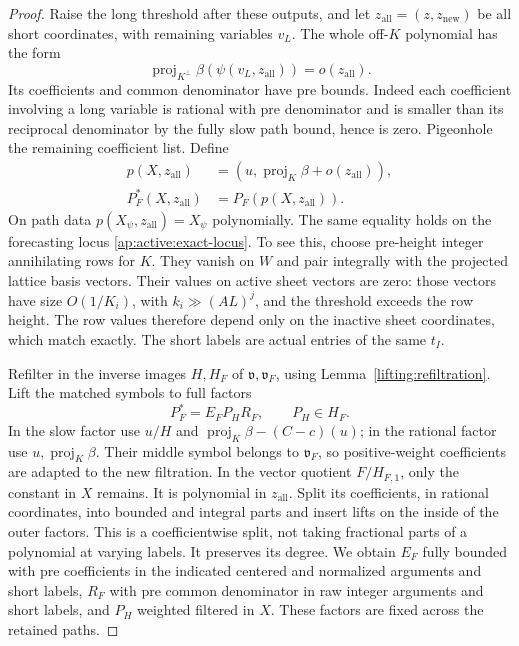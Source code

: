 \begin{proof}
Raise the long threshold after these outputs, and let
$z_{\mathrm{all}}=(z,z_{\mathrm{new}})$ be all short coordinates,
with remaining variables $v_L$.  The whole off-$K$ polynomial has
the form
\begin{equation}
 \operatorname{proj}_{K^\perp}\beta(\psi(v_L,z_{\mathrm{all}}))
                      =o(z_{\mathrm{all}}).
 \label{ap:active:off-space}
\end{equation}
Its coefficients and common denominator have pre bounds.  Indeed
each coefficient involving a long variable is rational with pre
denominator and is smaller than its reciprocal denominator by the
fully slow path bound, hence is zero.  Pigeonhole the remaining
coefficient list.  Define
\begin{equation}
 \begin{split}
 p(X,z_{\mathrm{all}})
   &=(u,\operatorname{proj}_K\beta+o(z_{\mathrm{all}})),\\
 P_F^*(X,z_{\mathrm{all}})&=P_F(p(X,z_{\mathrm{all}})).
 \end{split}
 \label{ap:active:projected-input}
\end{equation}
On path data $p(X_\psi,z_{\mathrm{all}})=X_\psi$ polynomially.
The same equality holds on the forecasting locus
\eqref{ap:active:exact-locus}.  To see this, choose pre-height
integer annihilating rows for $K$.  They vanish on $W$ and pair
integrally with the projected lattice basis vectors.  Their values
on active sheet vectors are zero: those vectors have size
$O(1/K_i)$, with $k_i\gg(AL)^j$, and the threshold exceeds the row
height.  The row values therefore depend only on the inactive sheet
coordinates, which match exactly.  The short labels are actual
entries of the same $t_I$.

Refilter in the inverse images $H,H_F$ of
$\mathfrak v,\mathfrak v_F$, using
Lemma~\ref{lifting:refiltration}.  Lift the matched symbols to full
factors
\begin{equation}
                 P_F^*=E_F P_H R_F,\qquad P_H\in H_F.
 \label{ap:active:marked-full-factors}
\end{equation}
In the slow factor use $u/H$ and
$\operatorname{proj}_K\beta-(C-c)(u)$; in the rational factor use
$u,\operatorname{proj}_K\beta$.  Their middle symbol belongs to
$\mathfrak v_F$, so positive-weight coefficients are adapted to
the new filtration.  In the vector quotient $F/H_{F,1}$, only the
constant in $X$ remains.  It is polynomial in $z_{\mathrm{all}}$.
Split its coefficients, in rational coordinates, into bounded and
integral parts and insert lifts on the inside of the outer factors.
This is a coefficientwise split, not taking fractional parts of a
polynomial at varying labels.  It preserves its degree.  We obtain
$E_F$ fully bounded with pre coefficients in the indicated centered
and normalized arguments and short labels, $R_F$ with pre common
denominator in raw integer arguments and short labels, and $P_H$
weighted filtered in $X$.  These factors are fixed across the
retained paths.


\end{proof}
